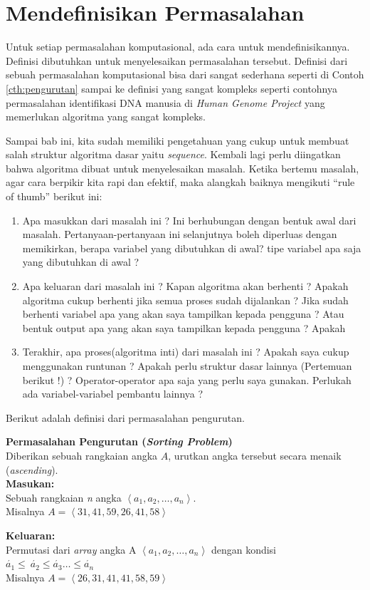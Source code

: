 \section{Mendefinisikan Permasalahan}

Untuk setiap permasalahan komputasional, ada cara untuk mendefinisikannya. Definisi dibutuhkan untuk menyelesaikan permasalahan tersebut. Definisi dari sebuah permasalahan komputasional bisa dari sangat sederhana seperti di Contoh \ref{cth:pengurutan} sampai ke definisi yang sangat kompleks seperti contohnya permasalahan identifikasi DNA manusia di \textit{Human Genome Project} yang memerlukan algoritma yang sangat kompleks.

Sampai bab ini, kita sudah memiliki pengetahuan yang cukup untuk membuat salah struktur algoritma dasar yaitu \textit{sequence}. Kembali lagi perlu diingatkan bahwa algoritma dibuat untuk menyelesaikan masalah. Ketika bertemu masalah, agar cara berpikir kita rapi dan efektif, maka alangkah baiknya mengikuti ``rule of thumb'' berikut ini: 
\begin{enumerate}
	\item Apa masukkan dari masalah ini ? Ini berhubungan dengan bentuk awal dari  masalah. Pertanyaan-pertanyaan ini selanjutnya boleh diperluas dengan memikirkan, berapa variabel yang dibutuhkan di awal? tipe variabel apa saja yang dibutuhkan  di awal ?
	\item Apa keluaran dari masalah ini ? Kapan algoritma akan berhenti ? Apakah algoritma cukup berhenti jika semua proses sudah dijalankan ?  Jika sudah berhenti variabel apa yang akan saya tampilkan kepada pengguna ? Atau bentuk output apa yang akan saya tampilkan kepada pengguna ?  Apakah 
	\item Terakhir, apa proses(algoritma inti) dari masalah ini ? Apakah saya cukup menggunakan runtunan ? Apakah perlu struktur dasar lainnya (Pertemuan berikut !) ? Operator-operator apa saja yang perlu saya gunakan. Perlukah ada variabel-variabel pembantu lainnya ?
\end{enumerate}
Berikut adalah definisi dari permasalahan pengurutan.
\begin{contoh}
\label{cth:pengurutan}
\textbf{Permasalahan Pengurutan (\textit{Sorting Problem})}\\
Diberikan sebuah rangkaian angka $A$, urutkan angka tersebut secara menaik (\textit{ascending}).\\
\textbf{Masukan:}\\
Sebuah rangkaian \textit{n} angka $\left\langle a_{1},a_{2},\ldots,a_{n} \right\rangle$.\\
Misalnya $A = \left\langle 31,41,59,26,41,58 \right\rangle$

\textbf{Keluaran:}\\ 
Permutasi dari \textit{array} angka A $\left\langle a_{1},a_{2},\ldots,a_{n}\right\rangle$ dengan kondisi $\acute{a_{1}} \leq\ \acute{a_{2}} \leq \acute{a_{3}} \ldots \leq \acute{a_{n}}$ \\
Misalnya $A = \left\langle 26,31,41,41,58,59 \right\rangle$
\end{contoh}
